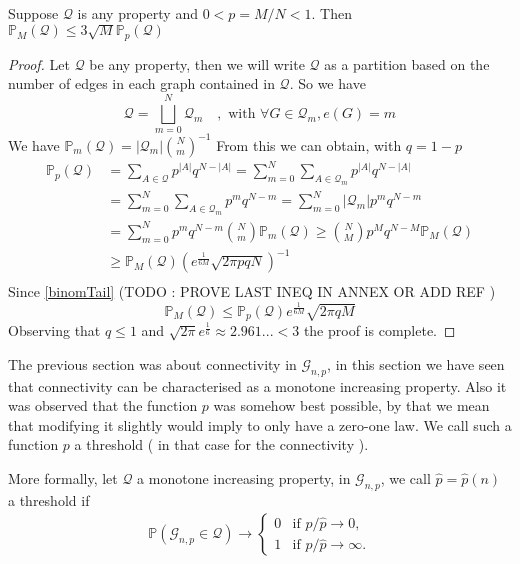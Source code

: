 \begin{theorem}\label{th:linkMP}
	Suppose $\mathcal{Q}$ is any property and $0 < p = M/N< 1$. 
	\newline
	Then $\mathbb{P}_M(\mathcal{Q}) \leq 3 \sqrt{M}\mathbb{P}_p(\mathcal{Q})$
\end{theorem}
\begin{proof}
	Let $\mathcal{Q}$ be any property, then we will write $\mathcal{Q}$ as a partition based on the number of edges in each graph contained in $\mathcal{Q}$.
	\newline
	So we have
	$$\mathcal{Q} = \bigsqcup_{m=0}^{N} \mathcal{Q}_m \quad, \text{ with } \forall G \in \mathcal{Q}_m, e(G) = m$$
	We have $\mathbb{P}_m(\mathcal{Q}) = |\mathcal{Q}_m| \binom{N}{m}^{-1}$
	From this we can obtain, with $q = 1 - p$
	\begin{align*}
		\mathbb{P}_p(\mathcal{Q})	&= \sum_{A \in \mathcal{Q}} p^{|A|}q^{N-|A|}
						= \sum_{m=0}^{N}\sum_{A \in \mathcal{Q}_m} p^{|A|}q^{N-|A|}\\
						&= \sum_{m=0}^{N}\sum_{A \in \mathcal{Q}_m} p^{m}q^{N-m}
						= \sum_{m=0}^{N}|\mathcal{Q}_m|p^{m}q^{N-m}\\
						&= \sum_{m=0}^N p^mq^{N-m}\binom{N}{m}\mathbb{P}_m(\mathcal{Q}) 
						\geq \binom{N}{M}p^Mq^{N-M}\mathbb{P}_M(\mathcal{Q}) \\
						&\geq \mathbb{P}_M(\mathcal{Q})(e^{\frac{1}{6M}}\sqrt{2\pi p q N})^{-1}\\
	\end{align*}
	Since \eqref{binomTail} (TODO : PROVE LAST INEQ IN ANNEX OR ADD REF )
	\begin{equation}
		\mathbb{P}_M(\mathcal{Q}) \leq  \mathbb{P}_p(\mathcal{Q})e^{\frac{1}{6M}}\sqrt{2\pi q M}
	\end{equation}
	Observing that $q \leq 1$ and $\sqrt{2\pi}e^{\frac{1}{6}} \approx 2.961... < 3$ the proof is complete.
\end{proof}
The previous section was about connectivity in $\mathcal{G}_{n,p}$, in this section we have seen that connectivity can be characterised as a monotone increasing property.
Also it was observed that the function $p$ was somehow best possible, by that we mean that modifying it slightly would imply to only have a zero-one law. 
We call such a function $p$ a threshold ( in that case for the connectivity ). 
\newline

More formally, let $\mathcal{Q}$ a monotone increasing property,  in $\mathcal{G}_{n, p}$, we call $\hat{p} = \hat{p}(n)$ a threshold if
\begin{align}
	\mathbb{P}(\mathcal{G}_{n,p} \in \mathcal{Q}) \rightarrow \left\{\begin{array}{rl}
										0 & \text{if } p / \hat{p} \to 0,\\
										1 & \text{if } p / \hat{p} \to \infty.
									 \end{array}
									\right.
\end{align}

